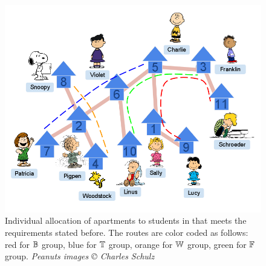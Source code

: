 \documentclass[MS,synopsis]{iitmdiss}
\begin{document}
\begin{figure}[htbp] %
  \centering
  \includegraphics[scale=0.3]{../img/3_infinite_loop.png}
  \caption{\figtabsize Individual allocation of apartments to students
    in {\residenceblock} that meets the requirements stated before.
    The routes are color coded as follows: red for
    \textcolor{red}{$\mathbb{B}$} group, blue for \textcolor{blue}{$\mathbb{T}$}
    group, orange for \textcolor{YellowOrange}{$\mathbb{W}$} group, green
    for \textcolor{green}{$\mathbb{F}$} group. {\tiny {\em Peanuts images
        {\copyright} Charles Schulz}}}
  \label{fig:streetmappathpeople}
\end{figure}
\end{document}
